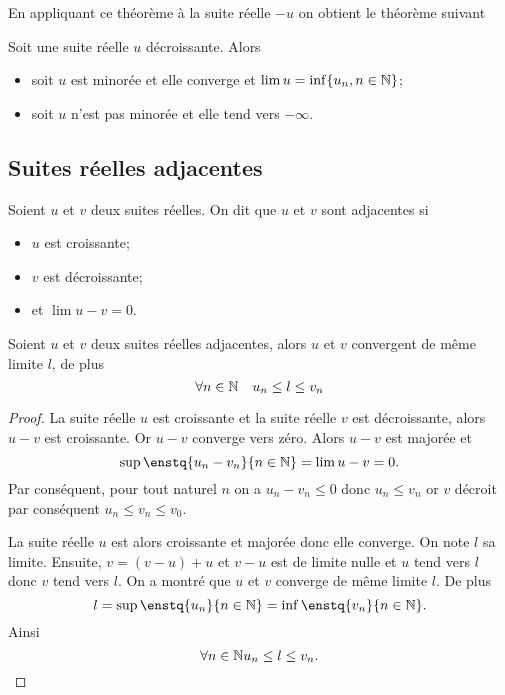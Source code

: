 En appliquant ce théorème à la suite réelle $-u$ on obtient le théorème suivant
\begin{theo}
  Soit une suite réelle $u$ décroissante. Alors
  \begin{itemize}
  \item soit $u$ est minorée et elle converge et $\lim u = \inf\{u_n, n \in \mathbb{N}\}$;
  \item soit $u$ n'est pas minorée et elle tend vers $-\infty$.
  \end{itemize}
\end{theo}

\subsection{Suites réelles adjacentes}

\begin{defdef}
  Soient $u$ et $v$ deux suites réelles. On dit que $u$ et $v$ sont adjacentes si
  \begin{itemize}
  \item $u$ est croissante;
  \item $v$ est décroissante;
  \item et $\lim u-v =0$.
  \end{itemize}
\end{defdef}
\begin{prop}
  Soient $u$ et $v$ deux suites réelles adjacentes, alors $u$ et $v$ convergent de même limite $l$, de plus
  \begin{equation}
    \forall n \in \mathbb{N} \quad u_n \leq l \leq v_n
  \end{equation}
\end{prop}
\begin{proof}
  La suite réelle $u$ est croissante et la suite réelle $v$ est décroissante, alors $u-v$ est croissante. Or $u-v$ converge vers zéro. Alors $u-v$ est majorée et
  \begin{equation}
    \sup\enstq{u_n-v_n}{n \in \N}=\lim u-v=0.
  \end{equation}
Par conséquent, pour tout naturel $n$ on a $u_n-v_n \leq 0$ donc $u_n \leq v_n$ or $v$ décroit par conséquent $u_n \leq v_n \leq v_0$.

La suite réelle $u$ est alors croissante et majorée donc elle converge. On note $l$ sa limite. Ensuite, $v=(v-u)+u$ et $v-u$ est de limite nulle et $u$ tend vers $l$ donc $v$ tend vers $l$. On a montré que $u$ et $v$ converge de même limite $l$. De plus
\begin{equation}
  l=\sup\enstq{u_n}{n\in \N}=\inf\enstq{v_n}{n\in \N}.
\end{equation}
Ainsi
\begin{equation}
  \forall n \in \mathbb{N} u_n \leq l \leq v_n.
\end{equation}
\end{proof}

